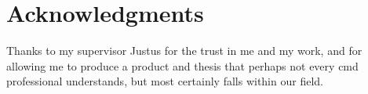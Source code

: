 
\begingroup
\let\clearpage\relax
\let\cleardoublepage\relax
\let\cleardoublepage\relax
\chapter*{Acknowledgments}

Thanks to my supervisor Justus for the trust in me and my work, and for
allowing me to produce a product and thesis that perhaps not every \gls{cmd}
professional understands, but most certainly falls within our field.

\endgroup
